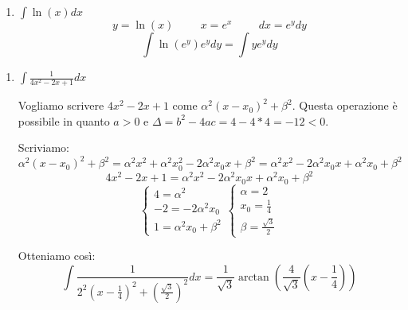 \begin{exercise}
\begin{enumerate}
    \begin{equation*}2\int\frac{2x+3}{x^2+3x+6}dx=\hspace{.5cm} y=x^2+3x+6\hspace{.5cm}dy=(2x+3)dx\end{equation*}
    \begin{equation*}2\int\frac{dy}{y}=2\ln|y|+c=2\ln(x^2+2x+6)+c\end{equation*}
    \item $\int \ln(x)dx$
    \begin{equation*}y=\ln(x)\hspace{1cm}x=e^x\hspace{1cm}dx=e^ydy\end{equation*}
    \begin{equation*}\int\ln(e^y)e^ydy=\int ye^ydy\end{equation*}
\end{enumerate}
\end{exercise}


\begin{exercise}\phantom{}
\begin{enumerate}
    \item $\int\frac{1}{4x^2-2x+1}dx$
    
    Vogliamo scrivere $4x^2-2x+1$ come $\alpha^2(x-x_0)^2+\beta^2$. Questa operazione è possibile in quanto $a>0$ e $\Delta=b^2-4ac=4-4*4=-12<0$.
    
    Scriviamo:\begin{equation*}\alpha^2(x-x_0)^2+\beta^2=\alpha^2x^2+\alpha^2x_0^2-2\alpha^2x_0x+\beta^2=\alpha^2x^2-2\alpha^2x_0x+\alpha^2x_0+\beta^2\end{equation*}\begin{equation*}4x^2-2x+1=\alpha^2x^2-2\alpha^2x_0x+\alpha^2x_0+\beta^2\end{equation*}
    $$\begin{cases}4=\alpha^2\\-2=-2\alpha^2x_0\\1=\alpha^2x_0+\beta^2\end{cases}\begin{cases}\alpha=2\\x_0=\frac{1}{4}\\\beta=\frac{\sqrt{3}}{2}\end{cases}$$
    
    Otteniamo così:
    \begin{equation*}
        \int\frac{1}{2^2(x-\frac{1}{4})^2+(\frac{\sqrt{3}}{2})^2}dx=\frac{1}{\sqrt{3}}\arctan(\frac{4}{\sqrt{3}}(x-\frac{1}{4}))
    \end{equation*}
\end{enumerate}
\end{exercise}

